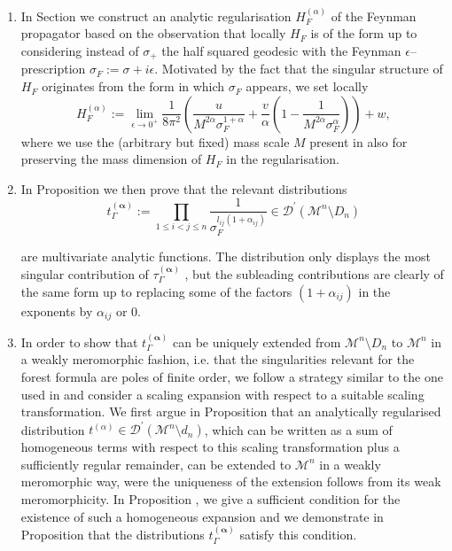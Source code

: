 \documentclass[10pt]{book}
\newcommand{\Dcal}{\mathcal{D}}
\newcommand{\Mcal}{\mathcal{M}}
\theoremstyle{break}
\begin{document}
\begin{enumerate}
\item In Section %
we construct an analytic regularisation $H^{(\alpha)}_F$ of the Feynman propagator based on the observation that locally $H_F$ is of the form %
up to considering instead of $\sigma_+$ the half squared geodesic with the Feynman $\epsilon$--prescription $\sigma_F := \sigma + i\epsilon$. Motivated by the fact that the singular structure of $H_F$ originates from the form in which $\sigma_F$ appears, we set locally
%
\begin{equation*}
H^{(\alpha)}_F := \lim_{\epsilon\to 0^+} \frac{1}{8\pi^2}\left(\frac{u}{M^{2\alpha}\sigma_F^{1+\alpha}} + \frac{v}{\alpha} \left(1-\frac{1}{M^{2\alpha}\sigma_F^{\alpha}}\right)\right)+w,
\end{equation*}
%
where we use the (arbitrary but fixed) mass scale $M$ present in %
also for preserving the mass dimension of $H_F$ in the regularisation.
\item In Proposition %
we then prove that the relevant distributions
%
\begin{equation*}
t_\Gamma^{(\boldsymbol{\alpha})} := \prod_{1\le i<j\le n} \frac{1}{\sigma_F^{l_{ij}(1+\alpha_{ij})}}\in \Dcal^\prime(\Mcal^n\setminus D_n)
\end{equation*}

%
are multivariate analytic functions. The distribution %
only displays the most singular contribution of $\tau^{(\boldsymbol{\alpha})}_\Gamma$ %
, but the subleading contributions are clearly of the same form up to replacing some of the factors $(1+\alpha_{ij})$ in the exponents by $\alpha_{ij}$ or 0.
\item In order to show that $t_\Gamma^{(\boldsymbol{\alpha})}$ can be uniquely extended from $\Mcal^n\setminus D_n$ to $\Mcal^n$ in a weakly meromorphic fashion, i.e. that the singularities relevant for the forest formula are poles of finite order, we follow a strategy similar to the one used in %
and consider a scaling expansion with respect to a suitable scaling transformation. We first argue in Proposition %
that an analytically regularised distribution $t^{(\alpha)}\in\Dcal^\prime(\Mcal^n\setminus d_n)$, which can be written as a sum of homogeneous terms with respect to this scaling transformation plus a sufficiently regular remainder, can be extended to $\Mcal^n$ in a weakly meromorphic way, were the uniqueness of the extension follows from its weak meromorphicity. In Proposition %
, we give a sufficient condition for the existence of such a homogeneous expansion and we demonstrate in Proposition %
that the distributions $t_\Gamma^{(\boldsymbol{\alpha})}$ satisfy this 
condition.


\end{enumerate}
\end{document}
